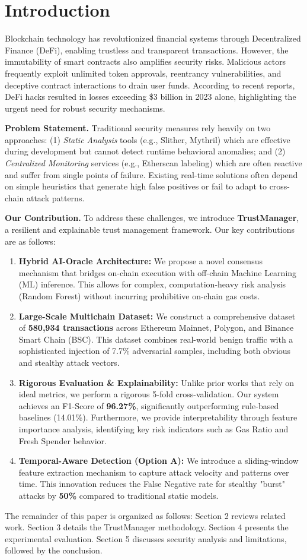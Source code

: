 \section{Introduction}
Blockchain technology has revolutionized financial systems through Decentralized Finance (DeFi), enabling trustless and transparent transactions. However, the immutability of smart contracts also amplifies security risks. Malicious actors frequently exploit unlimited token approvals, reentrancy vulnerabilities, and deceptive contract interactions to drain user funds. According to recent reports, DeFi hacks resulted in losses exceeding \$3 billion in 2023 alone, highlighting the urgent need for robust security mechanisms.

\textbf{Problem Statement.} Traditional security measures rely heavily on two approaches: (1) \textit{Static Analysis} tools (e.g., Slither, Mythril) which are effective during development but cannot detect runtime behavioral anomalies; and (2) \textit{Centralized Monitoring} services (e.g., Etherscan labeling) which are often reactive and suffer from single points of failure. Existing real-time solutions often depend on simple heuristics that generate high false positives or fail to adapt to cross-chain attack patterns.

\textbf{Our Contribution.} To address these challenges, we introduce \textbf{TrustManager}, a resilient and explainable trust management framework. Our key contributions are as follows:
\begin{enumerate}
    \item \textbf{Hybrid AI-Oracle Architecture:} We propose a novel consensus mechanism that bridges on-chain execution with off-chain Machine Learning (ML) inference. This allows for complex, computation-heavy risk analysis (Random Forest) without incurring prohibitive on-chain gas costs.
    \item \textbf{Large-Scale Multichain Dataset:} We construct a comprehensive dataset of \textbf{580,934 transactions} across Ethereum Mainnet, Polygon, and Binance Smart Chain (BSC). This dataset combines real-world benign traffic with a sophisticated injection of 7.7\% adversarial samples, including both obvious and stealthy attack vectors.
    \item \textbf{Rigorous Evaluation \& Explainability:} Unlike prior works that rely on ideal metrics, we perform a rigorous 5-fold cross-validation. Our system achieves an F1-Score of \textbf{96.27\%}, significantly outperforming rule-based baselines (14.01\%). Furthermore, we provide interpretability through feature importance analysis, identifying key risk indicators such as Gas Ratio and Fresh Spender behavior.
    \item \textbf{Temporal-Aware Detection (Option A):} We introduce a sliding-window feature extraction mechanism to capture attack velocity and patterns over time. This innovation reduces the False Negative rate for stealthy "burst" attacks by \textbf{50\%} compared to traditional static models.
\end{enumerate}

The remainder of this paper is organized as follows: Section 2 reviews related work. Section 3 details the TrustManager methodology. Section 4 presents the experimental evaluation. Section 5 discusses security analysis and limitations, followed by the conclusion.
